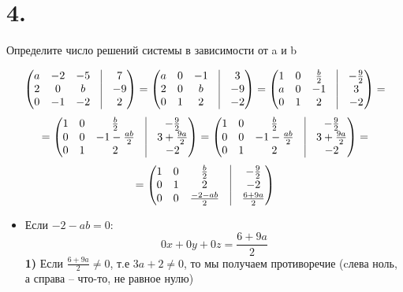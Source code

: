 \documentclass[a4paper,12pt]{article}
\begin{document}
\section*{4.}
Определите число решений системы в зависимости от a  и b
\begin{large}
\[
\begin{pmatrix}
a & -2 & -5 & \vrule &7\\
2 & 0 & b & \vrule & -9\\
0 & -1 & -2 & \vrule & 2\\
\end{pmatrix} =
\begin{pmatrix}
a & 0& -1 & \vrule &3\\
2 & 0 & b & \vrule & -9\\
0 & 1 & 2 & \vrule & -2\\
\end{pmatrix} = 
\begin{pmatrix}
1 & 0 & \frac{b}{2} & \vrule & -\frac{9}{2}\\
a & 0& -1 & \vrule &3\\
0 & 1 & 2 & \vrule & -2\\
\end{pmatrix} =
\]
\[
= 
\begin{pmatrix}
1 & 0 & \frac{b}{2} & \vrule & -\frac{9}{2}\\
0 & 0& -1-\frac{ab}{2} & \vrule &3 + \frac{9a}{2}\\
0 & 1 & 2 & \vrule & -2\\
\end{pmatrix} =
\begin{pmatrix}
1 & 0 & \frac{b}{2} & \vrule & -\frac{9}{2}\\
0 & 0& -1-\frac{ab}{2} & \vrule &3 + \frac{9a}{2}\\
0 & 1 & 2 & \vrule & -2\\
\end{pmatrix} =
\]
\[
=
\begin{pmatrix}
1 & 0 & \frac{b}{2} & \vrule & -\frac{9}{2}\\
0 & 1 & 2 & \vrule & -2\\
0 & 0& \frac{-2-ab}{2} & \vrule & \frac{6+9a}{2}\\
\end{pmatrix}
\]
\begin{itemize}
\item Если  $-2 - ab = 0$:
\[
0x + 0y + 0z = \frac{6+9a}{2}
\]
\textbf{1)} Если $\frac{6+9a}{2} \neq 0$, т.е  $3a+2 \neq 0$, то мы получаем противоречие (cлева ноль, а справа -- что-то, не равное нулю)


\end{itemize}
\end{large}
\end{document}
